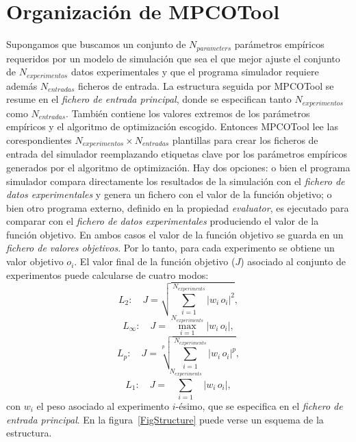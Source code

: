 \documentclass[a4paper]{report}
\newcommand{\EQ}[2]
{\begin{equation}#1\label{#2}\end{equation}}
\newcommand{\PSPICTURE}[7]
{
	\begin{figure}[ht!]
		\centering
		\pspicture(#1,#2)(#3,#4)
			#5
		\endpspicture
		\caption{#6.\label{#7}}
	\end{figure}
}
\newcommand{\ABS}[1]{\left|#1\right|}
\begin{document}
\chapter{Organización de MPCOTool}

Supongamos que buscamos un conjunto de $N_{parameters}$ parámetros empíricos 
requeridos por un modelo de simulación que sea el que mejor ajuste el conjunto
de $N_{experimentos}$ datos experimentales y que el programa simulador requiere
además $N_{entradas}$ ficheros de entrada.
La estructura seguida por MPCOTool se resume en el \emph{fichero de entrada
principal}, donde se especifican tanto $N_{experimentos}$ como $N_{entradas}$.
También contiene los valores extremos de los parámetros empíricos y el algoritmo
de optimización escogido. Entonces MPCOTool lee las corespondientes
$N_{experimentos}\times N_{entradas}$ plantillas para crear los ficheros de
entrada del simulador reemplazando etiquetas clave por los parámetros empíricos
generados por el algoritmo de optimización. Hay dos opciones: o bien el programa
simulador compara directamente los resultados de la simulación con el
\emph{fichero de datos experimentales} y genera un fichero con el valor de la
función objetivo; o bien otro programa externo, definido en la propiedad
\emph{evaluator}, es ejecutado para comparar con el \emph{fichero de datos
experimentales} produciendo el valor de la función objetivo. En ambos casos el
valor de la función objetivo se guarda en un \emph{fichero de valores
objetivos}. Por lo tanto, para cada experimento se obtiene un valor objetivo
$o_i$. El valor final de la función objetivo ($J$) asociado al conjunto de
experimentos puede calcularse de cuatro modos:
\EQ{L_2:\quad J=\sqrt{\sum_{i=1}^{N_{experiments}}\ABS{w_i\,o_i}^2},}
{EqObjectiveFunctionLII}
\EQ{L_\infty:\quad J=\max_{i=1}^{N_{experiments}}\ABS{w_i\,o_i},}
{EqObjectiveFunctionLi}
\EQ{L_p:\quad J=\sqrt[p]{\sum_{i=1}^{N_{experiments}}\ABS{w_i\,o_i}^p},}
{EqObjectiveFunctionLp}
\EQ{L_1:\quad J=\sum_{i=1}^{N_{experiments}}\ABS{w_i\,o_i},}
{EqObjectiveFunctionLI}
con $w_i$ el peso asociado al experimento $i$-ésimo, que se especifica en el
\emph{fichero de entrada principal}. En la figura~\ref{FigStructure} puede verse
un esquema de la estructura.
\end{document}
